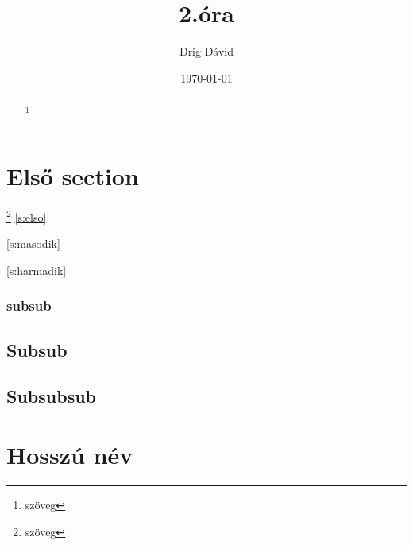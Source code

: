 \documentclass[12pt,twoside]{article}
\begin{document}
\pagestyle{fancy}
\setlength{\headheight}{52pt}


\renewcommand{\footrulewidth}{0.4pt}
\fancyhead[LE,RO]{\thepage}
\fancyhead[LO]{\leftmark}
\fancyhead[RE]{\rightmark}












\title{2.óra}
\author{Drig Dávid}
\date{\today}
\renewcommand{\thefootnote}{\fnsymbol{footnote}}
\maketitle



\begin{abstract}
\hulipsum[1]
\blindtext[1]
\footnote{szöveg}
\end{abstract}


\setcounter{tocdepth}{5} 
\tableofcontents
{}

\clearpage

\setcounter{secnumdepth}{5}

\section{Első section}\footnote{szöveg}
\autoref{s:elso}

\ref{s:masodik}

\ref{s:harmadik}


\pageref{s:masodik}

\pageref{s:harmadik}
\subsubsection{subsub}
\subsection{Subsub}
\hulipsum
{}\label{s:elso}
\subsection{Subsubsub}
\hulipsum

\section[Rövid név]{Hosszú név}
\end{document}
